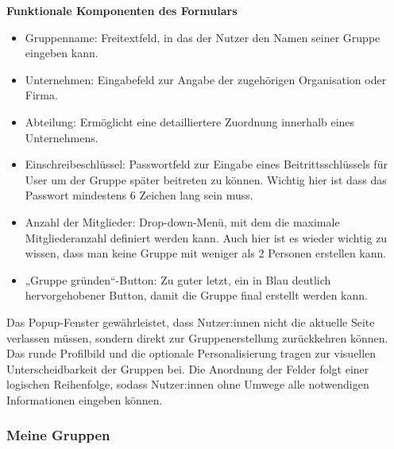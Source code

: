 \textbf{Funktionale Komponenten des Formulars}


\begin{itemize}
    \item Gruppenname: Freitextfeld, in das der Nutzer den Namen seiner Gruppe eingeben kann.
\end{itemize}

\begin{itemize}
    \item Unternehmen: Eingabefeld zur Angabe der zugehörigen Organisation oder Firma.
\end{itemize}

\begin{itemize}
    \item Abteilung: Ermöglicht eine detailliertere Zuordnung innerhalb eines Unternehmens.
\end{itemize}

\begin{itemize}
    \item Einschreibeschlüssel: Passwortfeld zur Eingabe eines Beitrittsschlüssels für User um der Gruppe später beitreten zu können. Wichtig hier ist dass das Passwort mindestens 6 Zeichen lang sein muss.
\end{itemize}

\begin{itemize}
    \item Anzahl der Mitglieder: Drop-down-Menü, mit dem die maximale Mitgliederanzahl definiert werden kann. Auch hier ist es wieder wichtig zu wissen, dass man keine Gruppe mit weniger als 2 Personen erstellen kann.
\end{itemize}

\begin{itemize}
    \item „Gruppe gründen“-Button: Zu guter letzt, ein in Blau deutlich hervorgehobener Button, damit die Gruppe final erstellt werden kann.
\end{itemize}

Das Popup-Fenster gewährleistet, dass Nutzer:innen nicht die aktuelle Seite verlassen müssen, sondern direkt zur Gruppenerstellung zurückkehren können.
Das runde Profilbild und die optionale Personalisierung tragen zur visuellen Unterscheidbarkeit der Gruppen bei.
Die Anordnung der Felder folgt einer logischen Reihenfolge, sodass Nutzer:innen ohne Umwege alle notwendigen Informationen eingeben können.


\subsubsection{Meine Gruppen}

